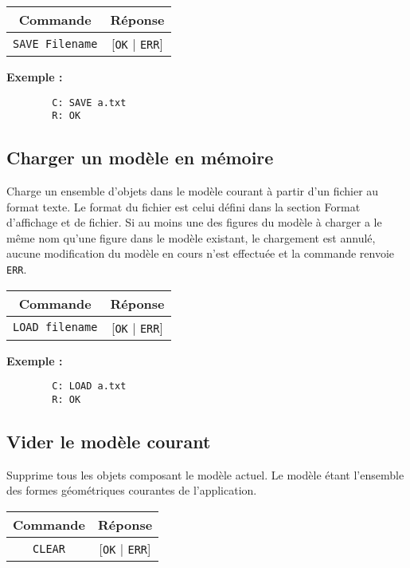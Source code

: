 \documentclass[11pt,a4paper]{article}
\begin{document}
	\begin{center}
		\begin{tabular}[c]{|c | c|}
			\hline
			\textbf{Commande} & \textbf{Réponse} \\
			\hline
			\texttt{SAVE Filename} & [\texttt{OK} | \texttt{ERR}] \\
			\hline
		\end{tabular}
	\end{center}
	
	\textbf{Exemple :}
	\begin{verbatim}
		C: SAVE a.txt
		R: OK
	\end{verbatim}
	
	\subsection{Charger un modèle en mémoire}
	Charge un ensemble d'objets dans le modèle courant à partir d'un fichier au format texte. Le format du fichier est celui défini dans la section Format d’affichage et de fichier. Si au moins une des figures du modèle à charger a le même nom qu'une figure dans le modèle existant, le chargement est annulé, aucune modification du modèle en cours n'est effectuée et la commande renvoie \texttt{ERR}.
	
	\begin{center}
		\begin{tabular}[c]{|c | c|}
			\hline
			\textbf{Commande} & \textbf{Réponse} \\
			\hline
			\texttt{LOAD filename} & [\texttt{OK} | \texttt{ERR}] \\
			\hline
		\end{tabular}
	\end{center}
	
	\textbf{Exemple :}
	\begin{verbatim}
		C: LOAD a.txt
		R: OK
	\end{verbatim}
	
	\subsection{Vider le modèle courant}
	Supprime tous les objets composant le modèle actuel. Le modèle étant l’ensemble des formes géométriques courantes de l’application.
	
	\begin{center}
		\begin{tabular}[c]{|c | c|}
			\hline
			\textbf{Commande} & \textbf{Réponse} \\
			\hline
			\texttt{CLEAR} & [\texttt{OK} | \texttt{ERR}] \\
			\hline
		\end{tabular}
	\end{center}
	
\end{document}
